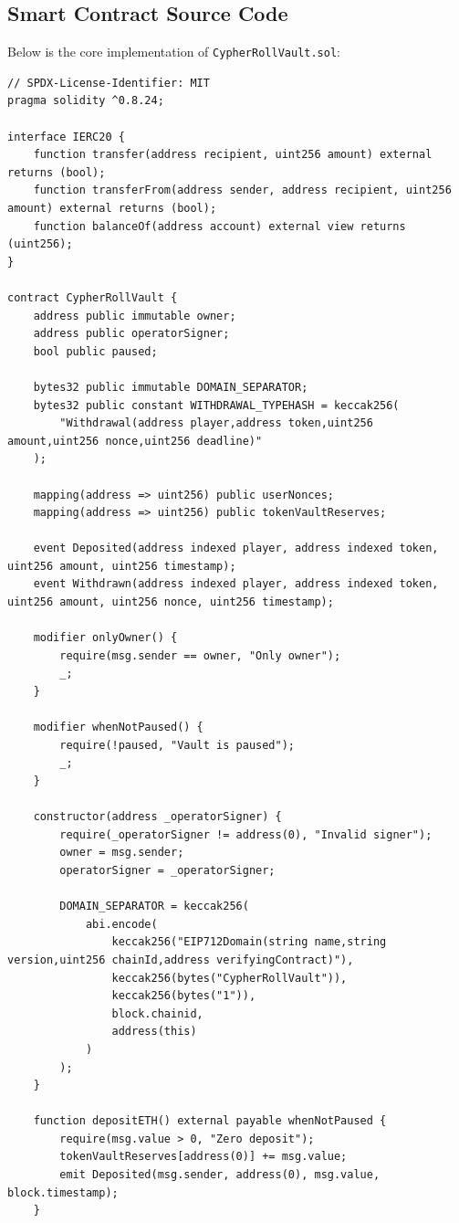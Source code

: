 \subsection{Smart Contract Source Code}
Below is the core implementation of \texttt{CypherRollVault.sol}:

\begin{lstlisting}[language=Solidity,caption={CypherRollVault.sol Smart Contract Implementation}]
// SPDX-License-Identifier: MIT
pragma solidity ^0.8.24;

interface IERC20 {
    function transfer(address recipient, uint256 amount) external returns (bool);
    function transferFrom(address sender, address recipient, uint256 amount) external returns (bool);
    function balanceOf(address account) external view returns (uint256);
}

contract CypherRollVault {
    address public immutable owner;
    address public operatorSigner;
    bool public paused;

    bytes32 public immutable DOMAIN_SEPARATOR;
    bytes32 public constant WITHDRAWAL_TYPEHASH = keccak256(
        "Withdrawal(address player,address token,uint256 amount,uint256 nonce,uint256 deadline)"
    );

    mapping(address => uint256) public userNonces;
    mapping(address => uint256) public tokenVaultReserves;

    event Deposited(address indexed player, address indexed token, uint256 amount, uint256 timestamp);
    event Withdrawn(address indexed player, address indexed token, uint256 amount, uint256 nonce, uint256 timestamp);

    modifier onlyOwner() {
        require(msg.sender == owner, "Only owner");
        _;
    }

    modifier whenNotPaused() {
        require(!paused, "Vault is paused");
        _;
    }

    constructor(address _operatorSigner) {
        require(_operatorSigner != address(0), "Invalid signer");
        owner = msg.sender;
        operatorSigner = _operatorSigner;

        DOMAIN_SEPARATOR = keccak256(
            abi.encode(
                keccak256("EIP712Domain(string name,string version,uint256 chainId,address verifyingContract)"),
                keccak256(bytes("CypherRollVault")),
                keccak256(bytes("1")),
                block.chainid,
                address(this)
            )
        );
    }

    function depositETH() external payable whenNotPaused {
        require(msg.value > 0, "Zero deposit");
        tokenVaultReserves[address(0)] += msg.value;
        emit Deposited(msg.sender, address(0), msg.value, block.timestamp);
    }


\end{lstlisting}
